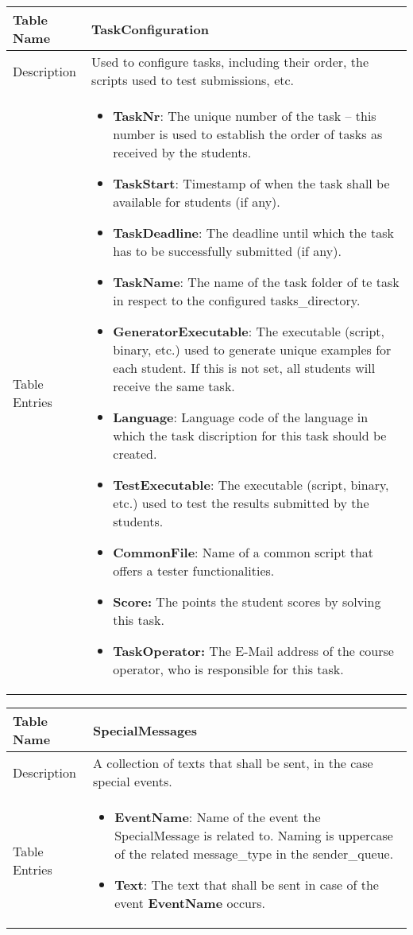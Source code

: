 \begin{tabular}{|p{3cm}|p{10cm}|}
\hline
Table Name & TaskConfiguration \\
\hline
Description & Used to configure tasks, including their order, the scripts used to test
    submissions, etc.\\
\hline
Table Entries & \begin{itemize}
    \item {\bf TaskNr}: The unique number of the task -- this number is used to establish
        the order of tasks as received by the students.
    \item {\bf TaskStart}: Timestamp of when the task shall be available for students
        (if any).
    \item {\bf TaskDeadline}: The deadline until which the task has to be successfully
        submitted (if any).
    \item {\bf TaskName}: The name of the task folder of te task in respect to the
    configured tasks\_directory.
    \item {\bf GeneratorExecutable}: The executable (script, binary, etc.) used to
        generate unique examples for each student. If this is not set, all students will
        receive the same task.
    \item {\bf Language}: Language code of the language in which the task discription for
        this task should be created.
    \item {\bf TestExecutable}: The executable (script, binary, etc.) used to test the
        results submitted by the students.
    \item {\bf CommonFile}: Name of a common script that offers a tester functionalities.
    \item {\bf Score:} The points the student scores by solving this task.
    \item {\bf TaskOperator:} The E-Mail address of the course operator, who is
        responsible for this task.
    \end{itemize}

\\
\hline
\end{tabular}

\begin{tabular}{|p{2.5cm}|p{11cm}|}
\hline
Table Name & SpecialMessages \\
\hline
Description & A collection of texts that shall be sent, in the case special events. \\
\hline
Table Entries & \begin{itemize}
    \item {\bf EventName}: Name of the event the SpecialMessage is related to. Naming is
        uppercase of the related message\_type in the sender\_queue.
    \item {\bf Text}: The text that shall be sent in case of the event {\bf EventName}
        occurs.
    \end{itemize} \\
\hline
\end{tabular}

